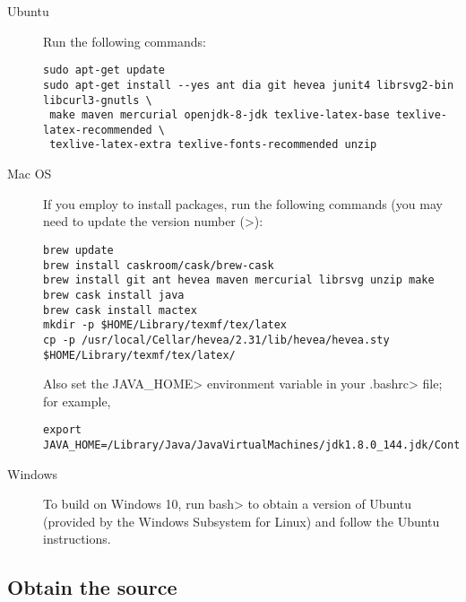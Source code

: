 \begin{description}
\item[Ubuntu]
  Run the following commands:

\begin{Verbatim}
sudo apt-get update
sudo apt-get install --yes ant dia git hevea junit4 librsvg2-bin libcurl3-gnutls \
 make maven mercurial openjdk-8-jdk texlive-latex-base texlive-latex-recommended \
 texlive-latex-extra texlive-fonts-recommended unzip
\end{Verbatim}


\item[Mac OS]
  If you employ  to install packages, run
  the following commands (you may need to update the version number (>):

\begin{Verbatim}
brew update
brew install caskroom/cask/brew-cask
brew install git ant hevea maven mercurial librsvg unzip make
brew cask install java
brew cask install mactex
mkdir -p $HOME/Library/texmf/tex/latex
cp -p /usr/local/Cellar/hevea/2.31/lib/hevea/hevea.sty $HOME/Library/texmf/tex/latex/
\end{Verbatim}

Also set the \<JAVA\_HOME> environment variable in your \<.bashrc> file;
for example,

\begin{Verbatim}
export JAVA_HOME=/Library/Java/JavaVirtualMachines/jdk1.8.0_144.jdk/Contents/Home
\end{Verbatim}


\item[Windows]
  To build on Windows 10,
  run \<bash> to obtain a version of
  Ubuntu (provided by the Windows Subsystem for Linux) and follow the Ubuntu
  instructions.


\end{description}


\subsection{Obtain the source\label{building-obtain-source}}

